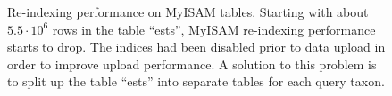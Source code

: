 \begin{figure}[h]
\centering
\def\svgwidth{0.8\textwidth}

\caption[Re-indexing performance on MyISAM tables]{
	Re-indexing performance on MyISAM tables. Starting with about $5.5\cdot10^6$
	rows in the table ``ests'', MyISAM re-indexing performance starts to drop.
	The indices had been disabled prior to data upload in order to improve upload
	performance. A solution to this problem is to split up the table ``ests'' into
	separate tables for each query taxon.
}
\label{fig:transaction-time}
\end{figure}
